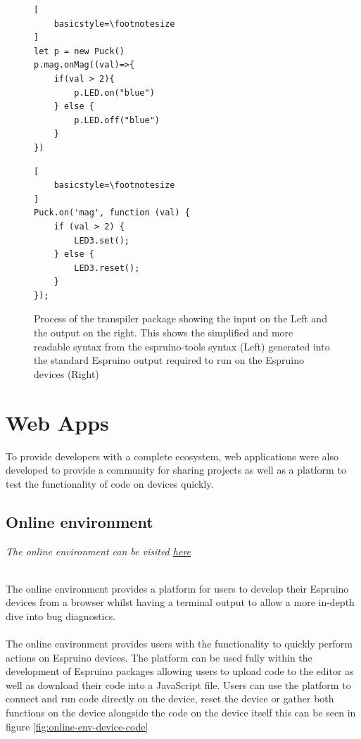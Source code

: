 \documentclass{l4proj}
\begin{document}
\begin{figure}[!ht]
\centering
\begin{minipage}{6cm}
  \centering
  \begin{lstlisting}[
    basicstyle=\footnotesize
]
let p = new Puck()
p.mag.onMag((val)=>{
    if(val > 2){
        p.LED.on("blue")
    } else {
        p.LED.off("blue")
    }
})

  \end{lstlisting}
\end{minipage}
\hspace{0.5cm}
\begin{minipage}{6cm}
  \centering
  
  \begin{lstlisting}[
    basicstyle=\footnotesize
]
Puck.on('mag', function (val) {
    if (val > 2) {
        LED3.set();
    } else {
        LED3.reset();
    }
});
  \end{lstlisting}
\end{minipage}


  \caption{Process of the transpiler package showing the input on the Left and the output on the right. This shows the simplified and more readable syntax from the espruino-tools syntax (Left) generated into the standard Espruino output required to run on the Espruino devices (Right)}
  \label{fig:transpiler-input-output}

\end{figure}

\section{Web Apps}
To provide developers with a complete ecosystem, web applications were also developed to provide a community for sharing projects as well as a platform to test the functionality of code on devices quickly.

\subsection{Online environment}
\begin{center}
\textit{The online environment can be visited \href{https://online-environment.vercel.app/}{here}} 
\end{center}
\\
\text The online environment provides a platform for users to develop their Espruino devices from a browser whilst having a terminal output to allow a more in-depth dive into bug diagnostics.
\\ \\
The online environment provides users with the functionality to quickly perform actions on Espruino devices. The platform can be used fully within the development of Espruino packages allowing users to upload code to the editor as well as download their code into a JavaScript file. Users can use the platform to connect and run code directly on the device, reset the device or gather both functions on the device alongside the code on the device itself this can be seen in figure \ref{fig:online-env-device-code}
\end{document}
